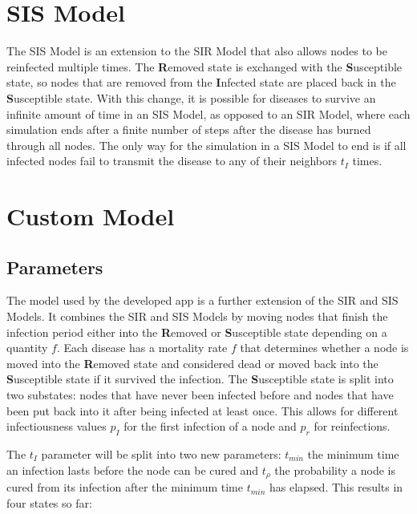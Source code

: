 \section{SIS Model}
The SIS Model is an extension to the SIR Model that also allows nodes to be reinfected multiple
times. The \textbf{R}emoved state is exchanged with the \textbf{S}usceptible state, so nodes
that are removed from the \textbf{I}nfected state are placed back in the \textbf{S}usceptible state.
With this change, it is possible for diseases to survive an infinite amount of time in an SIS Model, as opposed to an SIR Model, where each simulation ends after a finite number of steps after the 
disease has burned through all nodes. The only way for the simulation in a SIS Model to end is
if all infected nodes fail to transmit the disease to any of their neighbors $t_I$ times.

\section{Custom Model}
\label{sec:custom_model}
\subsection{Parameters}
The model used by the developed app is a further extension of the SIR and SIS Models. It 
combines the SIR and SIS Models by moving nodes that finish the infection period either
into the \textbf{R}emoved or \textbf{S}usceptible state depending on a quantity $f$. Each
disease has a mortality rate $f$ that determines whether a node is moved into the 
\textbf{R}emoved state and considered dead or moved back into the \textbf{S}usceptible
state if it survived the infection. The \textbf{S}usceptible state is split into two
substates: nodes that have never been infected before and nodes that have been put back into it after being infected at least once. This allows for different infectiousness values $p_I$ for the
first infection of a node and $p_r$ for reinfections. 

The $t_I$ parameter will be split into two new parameters: $t_{min}$ the minimum time an infection lasts before the node can be cured and $t_\rho$ the probability a node is cured from its infection
after the minimum time $t_{min}$ has elapsed. This results in four states so far:

